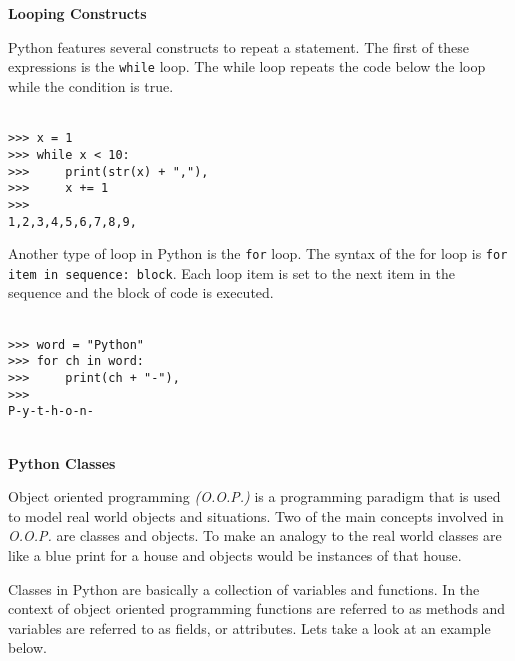 \documentclass[letterpaper,11pt]{article}
\begin{document}
\\ \\
\textbf{Looping Constructs}
\par{Python features several constructs to repeat a statement. The first of
these expressions is the \texttt{while} loop. The while loop repeats the code
below the loop while the condition is true.}
\\ \\
\begin{minipage}{.5\textwidth}
    \begin{tcolorbox}
        \begin{footnotesize}
            \begin{verbatim}
>>> x = 1
>>> while x < 10:
>>>     print(str(x) + ","),
>>>     x += 1
>>>
1,2,3,4,5,6,7,8,9,
            \end{verbatim}
        \end{footnotesize}
    \end{tcolorbox}
\end{minipage}
\par{Another type of loop in Python is the \texttt{for} loop. The syntax of the
for loop is \texttt{for item in sequence: block}. Each loop item is set to the
next item in the sequence and the block of code is executed.}
\\ \\
\begin{minipage}{.5\textwidth}
    \begin{tcolorbox}
        \begin{footnotesize}
            \begin{verbatim}
>>> word = "Python"
>>> for ch in word:
>>>     print(ch + "-"),
>>>
P-y-t-h-o-n-
            \end{verbatim}
        \end{footnotesize}
    \end{tcolorbox}
\end{minipage}
\\
\textbf{Python Classes}
\par{Object oriented programming \textit{(O.O.P.)} is a programming paradigm that is used to
    model real world objects and situations. Two of the main concepts involved
in \textit{O.O.P.} are classes and objects. To make an analogy to the real
world classes are like a blue print for a house and objects would be instances
of that house.}
\par{Classes in Python are basically a collection of variables and functions. In
the context of object oriented programming functions are referred to as methods
and variables are referred to as fields, or attributes. Lets take a look at an
example below.}
\end{document}
